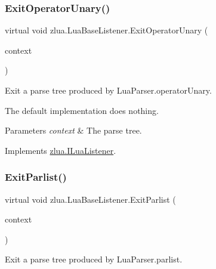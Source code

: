\subsubsection{\texorpdfstring{Exit\+Operator\+Unary()}{ExitOperatorUnary()}}
{\footnotesize\ttfamily virtual void zlua.\+Lua\+Base\+Listener.\+Exit\+Operator\+Unary (\begin{DoxyParamCaption}\item[{\mbox{[}\+Not\+Null\mbox{]} \mbox{\hyperlink{classzlua_1_1_lua_parser_1_1_operator_unary_context}{Lua\+Parser.\+Operator\+Unary\+Context}}}]{context }\end{DoxyParamCaption})\hspace{0.3cm}{\ttfamily [virtual]}}



Exit a parse tree produced by Lua\+Parser.\+operator\+Unary. 

The default implementation does nothing.


\begin{DoxyParams}{Parameters}
{\em context} & The parse tree.\\
\hline
\end{DoxyParams}


Implements \mbox{\hyperlink{interfacezlua_1_1_i_lua_listener_ab4c9d1484b1f65d892ad588b7b01814e}{zlua.\+I\+Lua\+Listener}}.

\mbox{\label{classzlua_1_1_lua_base_listener_af7c71a424a8f8682ecd95c95cff6e64b}} 
\subsubsection{\texorpdfstring{Exit\+Parlist()}{ExitParlist()}}
{\footnotesize\ttfamily virtual void zlua.\+Lua\+Base\+Listener.\+Exit\+Parlist (\begin{DoxyParamCaption}\item[{\mbox{[}\+Not\+Null\mbox{]} \mbox{\hyperlink{classzlua_1_1_lua_parser_1_1_parlist_context}{Lua\+Parser.\+Parlist\+Context}}}]{context }\end{DoxyParamCaption})\hspace{0.3cm}{\ttfamily [virtual]}}



Exit a parse tree produced by Lua\+Parser.\+parlist. 


